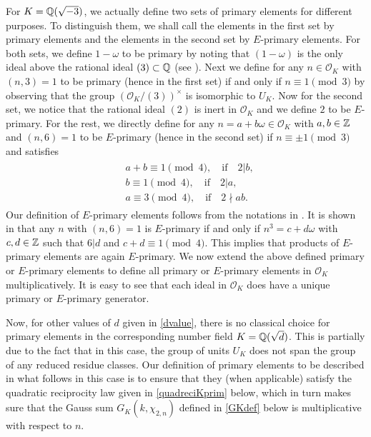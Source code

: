 \documentclass[twoside,leqno,10pt, A4]{amsart}
\begin{document}
 For $K=\mathbb Q(\sqrt{-3})$, we actually define two sets of primary elements for different purposes. To distinguish them, we shall call the elements in the first set by primary elements and the elements in the second set by $E$-primary elements. For both sets, we define $1-\omega$ to be
primary by noting that $(1-\omega)$ is the only ideal above the rational ideal $(3) \subset \mathbb Q$ (see \cite[Proposition 9.1.4]{I&R}). Next we
define for any $n \in \mathcal O_K$ with $(n, 3)=1$ to be primary (hence in the first set) if and only if $n \equiv 1 \pmod {3}$ by
observing that the group $\left (\mathcal{O}_K / (3) \right )^{\times}$ is isomorphic to $U_K$. Now for the second set, we notice that the rational ideal $(2)$ is inert in $\mathcal O_K$ and we define $2$ to be $E$-primary. For the rest, we directly define for any $n=a+b\omega \in \mathcal O_K$ with $a, b \in
\mathbb Z$ and $(n, 6)=1$ to be $E$-primary (hence in the second set) if $n \equiv \pm 1 \pmod 3$ and satisfies
\begin{align*}
\begin{split}
   & a+b \equiv 1 \pmod 4, \quad  \text{if} \quad 2 | b,  \\
   & b \equiv 1 \pmod 4, \quad  \text{if} \quad 2 | a,  \\
   & a \equiv 3 \pmod 4, \quad  \text{if} \quad 2 \nmid ab.
\end{split}
\end{align*}
  Our definition of $E$-primary elements follows from  the notations in \cite[Section 7.3]{Lemmermeyer}. It is shown in \cite[Lemma
7.9]{Lemmermeyer} that any $n$ with $(n,6)=1$ is $E$-primary if and only if $n^3=c+d\omega$ with $c, d \in \mathbb Z$ such that $6 | d$ and $c+d
\equiv 1 \pmod 4$. This implies that products of $E$-primary elements are again $E$-primary. We now extend the above defined primary or $E$-primary elements to define all primary or $E$-primary  elements in $\mathcal O_K$ multiplicatively.  It is easy to see that each ideal in $\mathcal O_K$ does have a unique primary or $E$-primary generator. \newline

   Now, for other values of $d$ given in \eqref{dvalue}, there is no classical choice for primary elements in the corresponding number field $K=\mathbb Q(\sqrt{d})$. This is partially due to the fact that in this case, the group of units $U_K$ does not span the group of any reduced residue classes.  Our definition of primary elements to be described in what follows in this case is to ensure that they (when applicable) satisfy the quadratic reciprocity law given in \eqref{quadreciKprim} below, which in turn makes sure that the Gauss sum $G_K(k,\chi_{2, n})$ defined in \eqref{GKdef} below is multiplicative with respect to $n$. \newline
\end{document}
